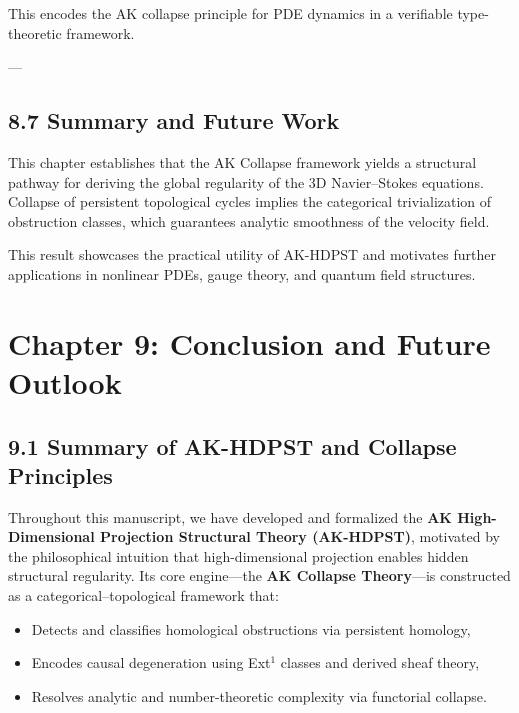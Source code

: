 \documentclass[11pt]{article}
\begin{document}
This encodes the AK collapse principle for PDE dynamics in a verifiable type-theoretic framework.

---

\subsection*{8.7 Summary and Future Work}

This chapter establishes that the AK Collapse framework yields a structural pathway  
for deriving the global regularity of the 3D Navier–Stokes equations.  
Collapse of persistent topological cycles implies the categorical trivialization of obstruction classes,  
which guarantees analytic smoothness of the velocity field.

This result showcases the practical utility of AK-HDPST and motivates further applications  
in nonlinear PDEs, gauge theory, and quantum field structures.



\section*{Chapter 9: Conclusion and Future Outlook}

\subsection*{9.1 Summary of AK-HDPST and Collapse Principles}

Throughout this manuscript, we have developed and formalized the \textbf{AK High-Dimensional Projection Structural Theory (AK-HDPST)},  
motivated by the philosophical intuition that high-dimensional projection enables hidden structural regularity.  
Its core engine—the \textbf{AK Collapse Theory}—is constructed as a categorical–topological framework that:

\begin{itemize}
  \item Detects and classifies homological obstructions via persistent homology,
  \item Encodes causal degeneration using Ext$^1$ classes and derived sheaf theory,
  \item Resolves analytic and number-theoretic complexity via functorial collapse.
\end{itemize}
\end{document}
